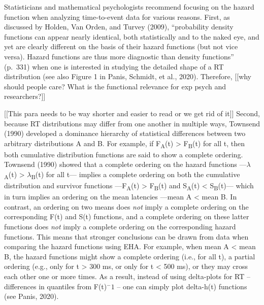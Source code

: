 \documentclass[
  man,floatsintext]{apa6}
\begin{document}
Statisticians and mathematical psychologists recommend focusing on the hazard function when analyzing time-to-event data for various reasons. First, as discussed by Holden, Van Orden, and Turvey (2009), ``probability density functions can appear nearly identical, both statistically and to the naked eye, and yet are clearly different on the basis of their hazard functions (but not vice versa). Hazard functions are thus more diagnostic than density functions'' (p.~331) when one is interested in studying the detailed shape of a RT distribution (see also Figure 1 in Panis, Schmidt, et al., 2020). Therefore, {[}{[}why should people care? What is the functional relevance for exp psych and researchers?{]}{]}

{[}{[}This para needs to be way shorter and easier to read or we get rid of it{]}{]}
Second, because RT distributions may differ from one another in multiple ways, Townsend (1990) developed a dominance hierarchy of statistical differences between two arbitrary distributions A and B. For example, if F\textsubscript{A}(t) \textgreater{} F\textsubscript{B}(t) for all t, then both cumulative distribution functions are said to show a complete ordering. Townsend (1990) showed that a complete ordering on the hazard functions ---\(\lambda\)\textsubscript{A}(t) \textgreater{} \(\lambda\)\textsubscript{B}(t) for all t--- implies a complete ordering on both the cumulative distribution and survivor functions ---F\textsubscript{A}(t) \textgreater{} F\textsubscript{B}(t) and S\textsubscript{A}(t) \textless{} S\textsubscript{B}(t)--- which in turn implies an ordering on the mean latencies ---mean A \textless{} mean B. In contrast, an ordering on two means does \emph{not} imply a complete ordering on the corresponding F(t) and S(t) functions, and a complete ordering on these latter functions does \emph{not} imply a complete ordering on the corresponding hazard functions. This means that stronger conclusions can be drawn from data when comparing the hazard functions using EHA. For example, when mean A \textless{} mean B, the hazard functions might show a complete ordering (i.e., for all t), a partial ordering (e.g., only for t \textgreater{} 300 ms, or only for t \textless{} 500 ms), or they may cross each other one or more times.
As a result, instead of using delta-plots for RT -- differences in quantiles from F(t)\(^-1\) -- one can simply plot delta-h(t) functions (see Panis, 2020).
\end{document}
